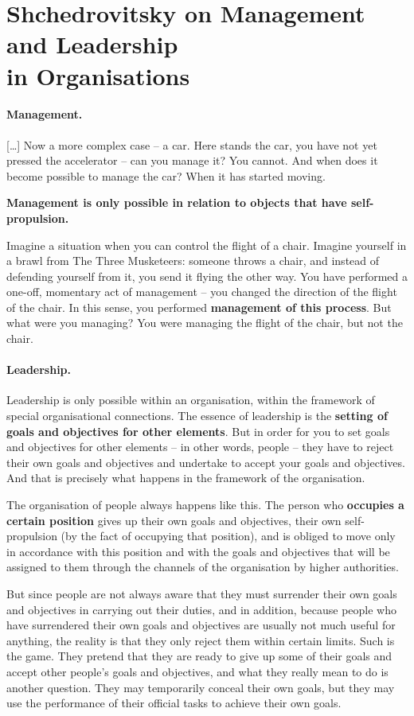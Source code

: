 \documentclass[11pt,a4paper]{article}
\begin{document}
\section{Shchedrovitsky \cite{MSM} on Management and Leadership\\ in
  Organisations} 

\paragraph{Management.}
[\ldots] Now a more complex case – a car. Here stands the car, you have not
yet pressed the accelerator – can you manage it? You cannot. And when does it
become possible to manage the car? When it has started moving.

\textbf{Management is only possible in relation to objects that have
  self-propulsion.}

Imagine a situation when you can control the flight of a chair. Imagine
yourself in a brawl from The Three Musketeers: someone throws a chair, and
instead of defending yourself from it, you send it flying the other way. You
have performed a one-off, momentary act of management – you changed the
direction of the flight of the chair. In this sense, you performed
\textbf{management of this process}. But what were you managing? You were
managing the flight of the chair, but not the chair.

\paragraph{Leadership.}
Leadership is only possible within an organisation, within the framework of
special organisational connections. The essence of leadership is the
\textbf{setting of goals and objectives for other elements}. But in order for
you to set goals and objectives for other elements – in other words, people –
they have to reject their own goals and objectives and undertake to accept
your goals and objectives. And that is precisely what happens in the framework
of the organisation.

The organisation of people always happens like this. The person who
\textbf{occupies a certain position} gives up their own goals and objectives,
their own self-propulsion (by the fact of occupying that position), and is
obliged to move only in accordance with this position and with the goals and
objectives that will be assigned to them through the channels of the
organisation by higher authorities.

But since people are not always aware that they must surrender their own goals
and objectives in carrying out their duties, and in addition, because people
who have surrendered their own goals and objectives are usually not much
useful for anything, the reality is that they only reject them within certain
limits. Such is the game. They pretend that they are ready to give up some of
their goals and accept other people’s goals and objectives, and what they
really mean to do is another question. They may temporarily conceal their own
goals, but they may use the performance of their official tasks to achieve
their own goals.
\end{document}
